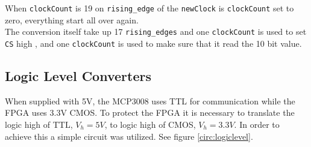 When \texttt{clockCount} is 19 on \texttt{rising\_edge} of the \texttt{newClock} is \texttt{clockCount} set to zero, everything start all over again. \\

The conversion itself take up 17 \texttt{rising\_edges} and one \texttt{clockCount} is used to set \texttt{CS} high ,  and one \texttt{clockCount} is used to make sure that it read the 10 bit value. 



\subsection{Logic Level Converters}
When supplied with 5V, the MCP3008 uses TTL for communication while the FPGA uses 3.3V CMOS. To protect the FPGA it is necessary to translate the logic high of TTL, $V_h=5V$, to logic high of CMOS, $V_h=3.3V$. In order to achieve this a simple circuit was utilized. See figure \ref{circ:logiclevel}. 
